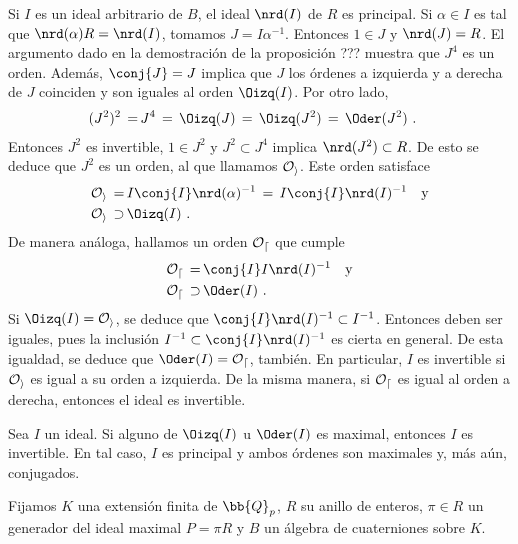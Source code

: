 \begin{obsConjugadosEInversos}
Si $I$ es un ideal arbitrario de $B$, el ideal $\nrd(I)$ de $R$ es principal.
Si $\alpha\in I$ es tal que $\nrd(\alpha)R=\nrd(I)$, tomamos $J=I\alpha^{-1}$.
Entonces $1\in J$ y $\nrd(J)=R$. El argumento dado en la demostraci\'{o}n
de la proposici\'{o}n ??? muestra que $J^{4}$ es un orden. Adem\'{a}s,
$\conj{J}=J$ implica que $J$ los \'{o}rdenes a izquierda y a derecha de $J$
coinciden y son iguales al orden $\Oizq(I)$. Por otro lado,
\begin{align*}
 (J^{2})^{2} \,=\, & J^{4}
	\,=\,\Oizq(J)\,=\,\Oizq(J^{2}) \,=\, \Oder(J^{2})
	\text{ .}
\end{align*}
%
Entonces $J^{2}$ es invertible, $1\in J^{2}$ y $J^{2}\subset J^{4}$
implica $\nrd(J^{2})\subset R$. De esto se deduce que $J^{2}$ es un orden,
al que llamamos $\cal{O}_{i}$. Este orden satisface
\begin{align*}
 \cal{O}_{i} \,=\, & I\conj{I}\nrd(\alpha)^{-1}
	\,=\, I\conj{I}\nrd(I)^{-1}\quad\text{y} \\
	\cal{O}_{i}\,\supset\, & \Oizq(I)
	\text{ .}
\end{align*}
%
De manera an\'{a}loga, hallamos un orden $\cal{O}_{d}$ que cumple
\begin{align*}
 \cal{O}_{d} \,=\, & \conj{I}I\nrd(I)^{-1}\quad\text{y} \\
	\cal{O}_{d} \,\supset\, & \Oder(I)
	\text{ .}
\end{align*}
%
Si $\Oizq(I)=\cal{O}_{i}$, se deduce que $\conj{I}\nrd(I)^{-1}\subset I^{-1}$.
Entonces deben ser iguales, pues la inclusi\'{o}n
$I^{-1}\subset\conj{I}\nrd(I)^{-1}$ es cierta en general.
De esta igualdad, se deduce que
$\Oder(I)=\cal{O}_{d}$, tambi\'{e}n. En particular, $I$ es invertible
si $\cal{O}_{i}$ es igual a su orden a izquierda. De la misma manera,
si $\cal{O}_{d}$ es igual al orden a derecha, entonces el ideal es invertible.
\end{obsConjugadosEInversos}

\begin{coroMaxOrdInvertible}
 Sea $I$ un ideal. Si alguno de $\Oizq(I)$ u $\Oder(I)$ es maximal,
 entonces $I$ es invertible. En tal caso, $I$ es principal y ambos
 \'{o}rdenes son maximales y, m\'{a}s a\'{u}n, conjugados.
\end{coroMaxOrdInvertible}

Fijamos $K$ una extensi\'{o}n finita de $\bb{Q}_{p}$, $R$ su anillo de
enteros, $\pi\in R$ un generador del ideal maximal $P=\pi R$ y $B$ un
\'{a}lgebra de cuaterniones sobre $K$.

